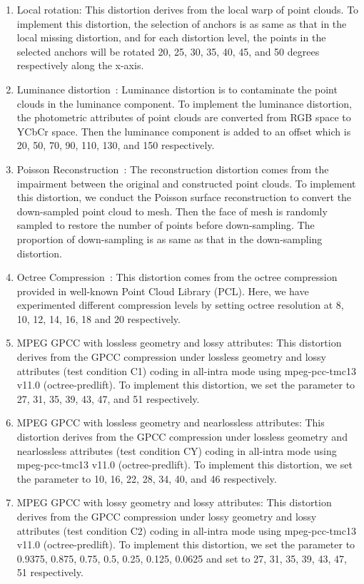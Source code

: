 \documentclass[acmsmall]{acmart}
\begin{document}
\begin{enumerate}
  \item {\sf Local rotation}: This distortion derives from the local warp of point clouds. To implement this distortion, the selection of anchors is as same as that in the local missing distortion, and for each distortion level, the points in the selected anchors will be rotated 20, 25, 30, 35, 40, 45, and 50 degrees respectively along the x-axis.
  \item {\sf Luminance distortion~\cite{Ponomarenko2015TID2013}}: Luminance distortion is to contaminate the point clouds in the luminance component. To implement the luminance distortion, the photometric attributes of point clouds are converted from RGB space to YCbCr space. Then the luminance component is added to an offset which is 20, 50, 70, 90, 110, 130, and 150 respectively.
  \item {\sf Poisson Reconstruction~\cite{Michael2006PoissonRC}}: The reconstruction distortion comes from the impairment between the original and constructed point clouds. To implement this distortion, we conduct the Poisson surface reconstruction to convert the down-sampled point cloud to mesh. Then the face of mesh is randomly sampled to restore the number of points before down-sampling. The proportion of down-sampling is as same as that in the down-sampling distortion.
    \item {\sf Octree Compression~\cite{Yang2020TMM3DTO2D}}: This distortion comes from the octree compression provided in well-known Point Cloud Library (PCL). Here, we have experimented different compression levels by setting octree resolution at 8, 10, 12, 14, 16, 18 and 20 respectively.
  \item {\sf MPEG GPCC with lossless geometry and lossy attributes}: This distortion derives from the GPCC compression under lossless geometry and lossy attributes (test condition C1) coding in all-intra mode using mpeg-pcc-tmc13 v11.0 (octree-predlift). To implement this distortion, we set the parameter  to 27, 31, 35, 39, 43, 47, and 51 respectively.
  \item {\sf MPEG GPCC with lossless geometry and nearlossless attributes}: This distortion derives from the GPCC compression under lossless geometry and nearlossless attributes (test condition CY) coding in all-intra mode using mpeg-pcc-tmc13 v11.0 (octree-predlift). To implement this distortion, we set the parameter  to 10, 16, 22, 28, 34, 40, and 46 respectively.
  \item {\sf MPEG GPCC with lossy geometry and lossy attributes}: This distortion derives from the GPCC compression under lossy geometry and lossy attributes (test condition C2) coding in all-intra mode using mpeg-pcc-tmc13 v11.0 (octree-predlift). To implement this distortion, we set the parameter  to 0.9375, 0.875, 0.75, 0.5, 0.25, 0.125, 0.0625 and set  to 27, 31, 35, 39, 43, 47, 51 respectively.


\end{enumerate}
\end{document}
